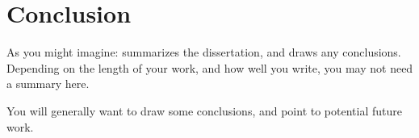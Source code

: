 \chapter{Conclusion}

\begin{guidance}
    As you might imagine: summarizes the dissertation, and draws
    any conclusions. Depending on the length of your work, and
    how well you write, you may not need a summary here.

    You will generally want to draw some conclusions, and point
    to potential future work.
\end{guidance}

